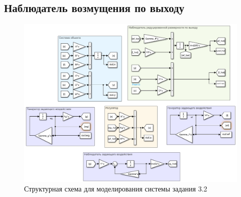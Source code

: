 \subsection{Наблюдатель возмущения по выходу}

\begin{figure}[H]
    \centering
    \includegraphics[width=\linewidth]{figs/32slx.png}
    \caption{Структурная схема для моделирования системы задания 3.2}
    \label{fig:31}
\end{figure}

